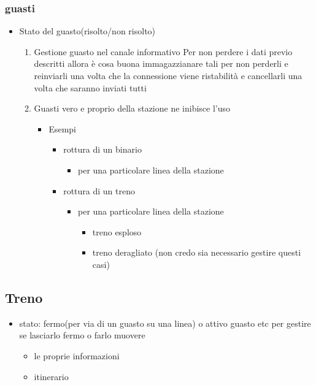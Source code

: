 \documentclass[11pt]{article}
\begin{document}
\subsubsection{guasti}
\label{sec:orgd7efaea}
\begin{itemize}
\item Stato del guasto(risolto/non risolto)
\begin{enumerate}
\item Gestione guasto nel canale informativo
Per non perdere i dati previo descritti allora è cosa buona immagazzianare tali per non perderli e reinviarli una volta che la connessione viene ristabilità e cancellarli una volta che saranno inviati tutti
\item Guasti vero e proprio della stazione
ne inibisce l'uso
\begin{itemize}
\item Esempi
\begin{itemize}
\item rottura di un binario
\begin{itemize}
\item per una particolare linea della stazione
\end{itemize}
\item rottura di un treno
\begin{itemize}
\item per una particolare linea della stazione
\begin{itemize}
\item treno esploso
\item treno deragliato (non credo sia necessario gestire questi casi)
\end{itemize}
\end{itemize}
\end{itemize}
\end{itemize}
\end{enumerate}
\end{itemize}
\subsection{Treno}
\label{sec:org91c8a1f}
\begin{itemize}
\item stato: fermo(per via di un guasto su una linea) o attivo guasto etc per gestire se lasciarlo fermo o farlo muovere
\begin{itemize}
\item le proprie informazioni
\item itinerario
\end{itemize}
\end{itemize}
\end{document}
